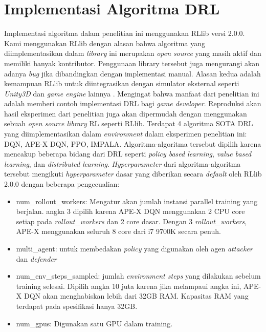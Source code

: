 \section{Implementasi Algoritma DRL}
Implementasi algoritma dalam penelitian ini menggunakan RLlib versi 2.0.0.
Kami menggunakan RLlib dengan alasan bahwa algoritma yang diimplementasikan dalam \emph{library} ini
merupakan \emph{open source} yang masih aktif dan memiliki banyak kontributor. 
Penggunaan library tersebut juga mengurangi akan adanya \emph{bug} jika dibandingkan dengan implementasi manual.
Alasan kedua adalah kemampuan RLlib untuk diintegrasikan dengan simulator eksternal seperti \emph{Unity3D}
dan \emph{game engine} lainnya \citep{rllibDocumentation}.
Mengingat bahwa manfaat dari penelitian ini adalah memberi contoh implementasi DRL
bagi \emph{game developer}.
Reproduksi akan hasil eksperimen dari penelitian juga akan dipermudah dengan 
menggunakan sebuah \emph{open source library} RL seperti RLlib.
Terdapat 4 algoritma SOTA DRL yang diimplementasikan dalam \emph{environment} dalam
eksperimen penelitian ini: DQN, APE-X DQN, PPO, IMPALA. 
Algoritma-algoritma tersebut dipilih karena mencakup beberapa bidang dari DRL seperti
\emph{policy based learning}, \emph{value based learning}, dan \emph{distributed learning}.
\emph{Hyperparameter} dari algoritma-algoritma tersebut mengikuti \emph{hyperparameter}
dasar yang diberikan secara \emph{default} oleh RLlib 2.0.0 dengan beberapa pengecualian:
\begin{itemize}
  \item num\_rollout\_workers: Mengatur akan jumlah instansi parallel training yang berjalan.
  angka 3 dipilih karena APE-X DQN menggunakan 2 CPU core setiap pada \emph{rollout\_workers}
  dan 2 core dasar. Dengan 3 \emph{rollout\_workers}, APE-X menggunakan seluruh 8 core dari i7 9700K
  secara penuh.

  \item multi\_agent: untuk membedakan \emph{policy}
  yang digunakan oleh agen \emph{attacker} dan \emph{defender}

  \item num\_env\_steps\_sampled: jumlah \emph{environment steps} yang dilakukan sebelum training selesai.
  Dipilih angka 10 juta karena jika melampaui angka ini, APE-X DQN akan menghabiskan lebih dari 32GB RAM.
  Kapasitas RAM yang terdapat pada spesifikasi hanya 32GB.
  
  \item num\_gpus: Digunakan satu GPU dalam training.
\end{itemize}

